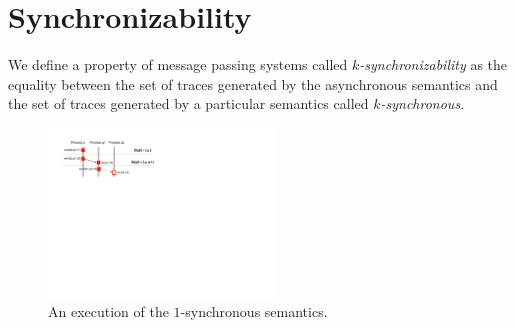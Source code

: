 \section{Synchronizability}\label{sec:criterion}

We define a property of message passing systems called \emph{$k$-synchronizability} as the equality between the set of traces generated by the asynchronous semantics and the set of traces generated by a particular semantics called \emph{$k$-synchronous}. %

\begin{figure}[t]
\begin{center}
\includegraphics[width=6cm]{ex-blocking.pdf}
\end{center}
\vspace{-3mm}
\caption{An execution of the $1$-synchronous semantics.}
\label{fig:ex-blocking}
\vspace{-6mm}
\end{figure}

